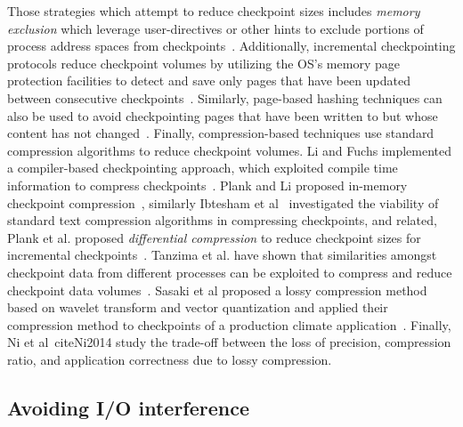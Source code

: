 Those strategies which attempt to reduce checkpoint sizes includes \emph{memory
exclusion} which leverage user-directives or other hints to exclude portions of
process address spaces from checkpoints~\cite{Plank99MemoryExclusion}.
Additionally, incremental checkpointing protocols reduce checkpoint volumes by
utilizing the OS's memory page protection facilities to detect and save only
pages that have been updated between consecutive
checkpoints~\cite{Bronevetsky09Compiler,
Chen97CLIP,Elnozahy92ConsistentCheckpointing,Li94ConcurrentCheckpointing,
Plank94Libckpt,Paun10IncrementalWeibull,Kiswany08stdchk}.  Similarly,
page-based hashing techniques can also be used to avoid checkpointing pages
that have been written to but whose content has not
changed~\cite{Ferreira11Libhashckpt}.  Finally, compression-based techniques
use standard compression algorithms to reduce checkpoint volumes.  Li and Fuchs
implemented a compiler-based checkpointing approach, which exploited compile
time information to compress checkpoints~\cite{Li90CATCH}.  Plank and Li
proposed in-memory checkpoint compression~\cite{Plank94ICKP}, similarly
Ibtesham et al~\cite{Ibtesham12Compression} investigated the viability of
standard text compression algorithms in compressing checkpoints, and related,
Plank et al. proposed \textit{differential compression} to reduce checkpoint
sizes for incremental checkpoints~\cite{Plank95CompressedDiff}.  Tanzima et al.
have shown that similarities amongst checkpoint data from different processes
can be exploited to compress and reduce checkpoint data
volumes~\cite{tanzima12mcrengine}.  Sasaki et al proposed a lossy compression
method based on wavelet transform and  vector  quantization and applied  their
compression method  to   checkpoints of a  production climate
application~\cite{sasaki2015}.  Finally, Ni et al~cite{Ni2014} study the trade-off
between the loss of precision, compression ratio, and application correctness
due to lossy compression.

 \subsection{Avoiding I/O interference}

